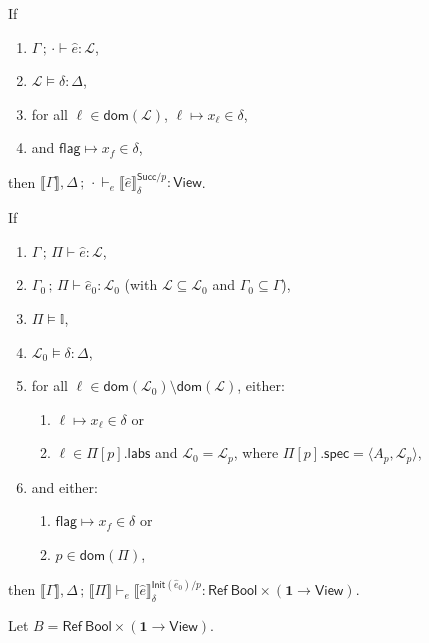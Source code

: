 \documentclass{article}
\newcommand{\mf}[1]{\mathsf{#1}}
\newcommand{\mc}[1]{\mathcal{#1}}
\newcommand{\mb}[1]{\mathbf{#1}}
\newcommand{\semi}{\,;\,}
\newcommand{\dom}{\mf{dom}}
\newcommand{\llrr}[1]{\llbracket #1 \rrbracket}
\newcommand{\pair}[2]{\langle #1, #2 \rangle}
\newcommand{\tone}{\mb{1}}
\newcommand{\tbool}{\mf{Bool}}
\newcommand{\tview}{\mf{View}}
\newcommand{\tref}[1]{\mf{Ref}\ #1}
\newcommand{\Ell}{\mc{L}}
\newcommand{\I}{\mathbb{I}}
\begin{document}
\begin{corollary}
\label{thm:sprezsucc}
If \begin{enumerate}[label=(\roman*)]
\item $\Gamma \semi \cdot \vdash \hat{e}: \Ell$,
\item $\Ell \vDash \delta: \Delta$,
\item for all $\ell \in \dom(\Ell)$, $\ell \mapsto x_\ell \in \delta$,
\item and $\mf{flag} \mapsto x_f \in \delta$,
\end{enumerate}
then $\llrr{\Gamma}, \Delta \semi \cdot
\vdash_e
\llrr{\hat{e}}^{\mf{Succ}/p}_\delta: \mf{View}$.
\end{corollary}

\begin{theorem}
\label{thm:oldtprezinit}
If \begin{enumerate}[label=(\roman*)]
\item $\Gamma \semi \Pi \vdash \hat{e}: \Ell$,
\item $\Gamma_0 \semi \Pi \vdash \hat{e}_0: \Ell_0$ 
(with $\Ell \subseteq \Ell_0$ and $\Gamma_0 \subseteq \Gamma$),
\item $\Pi \vDash \I$,
\item $\Ell_0 \vDash \delta: \Delta$,
\item for all $\ell \in \dom(\Ell_0) \setminus \dom(\Ell)$, either: 
  \begin{enumerate}[label=(v-\alph*)]
  \item $\ell \mapsto x_\ell \in \delta$ or
  \item $\ell \in \Pi[p].\mf{labs}$ and
  $\Ell_0 = \Ell_p$, where $\Pi[p].\mf{spec}=\pair{A_p}{\Ell_p}$,
  \end{enumerate}
\item and either:
  \begin{enumerate}[label=(vi-\alph*)]
  \item $\mf{flag} \mapsto x_f \in \delta$ or
  \item $p \in \dom(\Pi)$,
  \end{enumerate}
\end{enumerate}
then $\llrr{\Gamma}, \Delta \semi \llrr{\Pi} 
\vdash_e
\llrr{\hat{e}}^{\mf{Init}(\hat{e}_0)/p}_\delta: 
\tref{\tbool} \times (\tone \rightarrow \tview)$.

\begin{Proof}
Let $B = \tref{\tbool} \times (\tone \rightarrow \tview)$.


\end{Proof}
\end{theorem}
\end{document}

